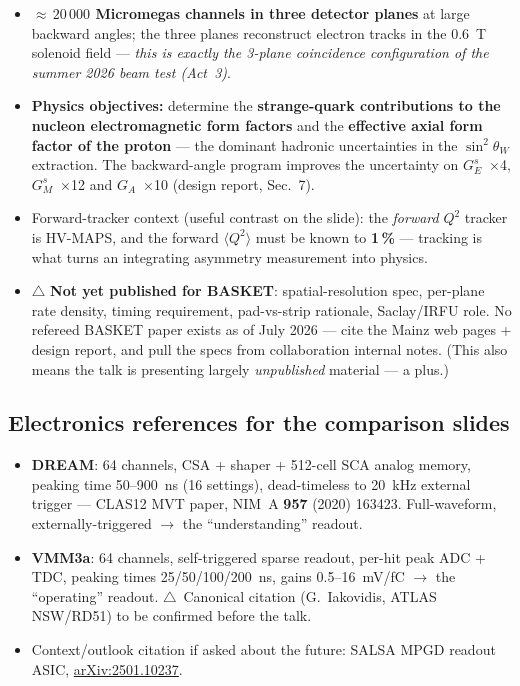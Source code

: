 \documentclass[11pt,a4paper]{article}
\begin{document}
\begin{itemize}[itemsep=2pt]
  \item \textbf{${\approx}\,20\,000$ Micromegas channels in three detector
    planes} at large backward angles; the three planes reconstruct electron
    tracks in the 0.6~T solenoid field --- \emph{this is exactly the 3-plane
    coincidence configuration of the summer 2026 beam test (Act~3)}.
  \item \textbf{Physics objectives:} determine the \textbf{strange-quark
    contributions to the nucleon electromagnetic form factors} and the
    \textbf{effective axial form factor of the proton} --- the dominant
    hadronic uncertainties in the $\sin^2\theta_W$ extraction. The
    backward-angle program improves the uncertainty on
    $G_E^s$~$\times$4, $G_M^s$~$\times$12 and $G_A$~$\times$10
    (design report, Sec.~7).
  \item Forward-tracker context (useful contrast on the slide): the
    \emph{forward} $Q^2$ tracker is HV-MAPS, and the forward
    $\langle Q^2\rangle$ must be known to \textbf{1\,\%} --- tracking is what
    turns an integrating asymmetry measurement into physics.
  \item $\triangle$ \textbf{Not yet published for BASKET}: spatial-resolution
    spec, per-plane rate density, timing requirement, pad-vs-strip rationale,
    Saclay/IRFU role. No refereed BASKET paper exists as of July 2026 ---
    cite the Mainz web pages + design report, and pull the specs from
    collaboration internal notes. (This also means the talk is presenting
    largely \emph{unpublished} material --- a plus.)
\end{itemize}

\subsection*{Electronics references for the comparison slides}

\begin{itemize}[itemsep=2pt]
  \item \textbf{DREAM}: 64 channels, CSA + shaper + 512-cell SCA analog
    memory, peaking time 50--900~ns (16 settings), dead-timeless to 20~kHz
    external trigger --- CLAS12 MVT paper, NIM~A \textbf{957} (2020) 163423.
    Full-waveform, externally-triggered $\rightarrow$ the ``understanding''
    readout.
  \item \textbf{VMM3a}: 64 channels, self-triggered sparse readout, per-hit
    peak ADC + TDC, peaking times 25/50/100/200~ns, gains 0.5--16~mV/fC
    $\rightarrow$ the ``operating'' readout. $\triangle$~Canonical citation
    (G.~Iakovidis, ATLAS NSW/RD51) to be confirmed before the talk.
  \item Context/outlook citation if asked about the future: SALSA MPGD
    readout ASIC, \href{https://arxiv.org/abs/2501.10237}{arXiv:2501.10237}.
\end{itemize}
\end{document}
